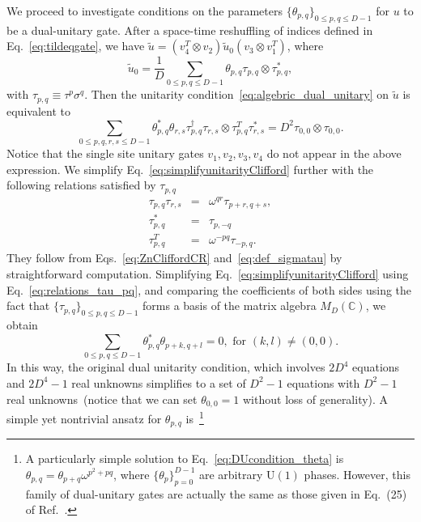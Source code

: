\documentclass[aps,prx,twocolumn,notitlepage,nofootinbib,nobalancelastpage]{revtex4-2}
\theoremstyle{break}
\newcommand{\1}{\mathbbm{1}}
\theoremstyle{plain}
\theoremstyle{plain}
\theoremstyle{plain}
\begin{document}
We proceed to investigate conditions on the parameters $\{\theta_{p,q}\}_{0\leq p,q\leq D-1}$ for $u$ to be a dual-unitary gate. After a space-time reshuffling of indices defined in Eq.~\eqref{eq:tildeqgate}, we have $\tilde{u}= (v_4^T\otimes v_2)\tilde{u}_0(v_3\otimes v_1^T)$, where
\begin{equation}
    \tilde{u}_0=\frac{1}{D}\sum_{0\leq p,q\leq D-1} \theta_{p,q}\tau_{p,q}\otimes\tau^*_{p,q},
\end{equation}
with $\tau_{p,q}\equiv\tau^p\sigma^q$. Then the unitarity condition~\eqref{eq:algebric_dual_unitary} on $\tilde{u}$ is equivalent to 
\begin{equation}\label{eq:simplifyunitarityClifford}
    \sum_{0\leq p,q,r,s\leq D-1} \theta^*_{p,q}\theta_{r,s}\tau^\dagger_{p,q}\tau_{r,s}\otimes\tau^T_{p,q}\tau^*_{r,s}=D^2 \tau_{0,0}\otimes\tau_{0,0}.
\end{equation}
Notice that the single site unitary gates $v_{1},v_{2},v_{3},v_{4}$ do not appear in the above expression. We simplify Eq.~\eqref{eq:simplifyunitarityClifford} further with the following relations satisfied by $\tau_{p,q}$
\begin{eqnarray}\label{eq:relations_tau_pq}
    \tau_{p,q}\tau_{r,s}&=&\omega^{qr}\tau_{p+r,q+s},\nonumber\\
    \tau^*_{p,q}&=&\tau_{p,-q}\nonumber\\
    \tau^T_{p,q}&=&\omega^{-pq}\tau_{-p,q}.
\end{eqnarray}
They follow from Eqs.~\eqref{eq:ZnCliffordCR} and~\eqref{eq:def_sigmatau} by straightforward computation. Simplifying Eq.~\eqref{eq:simplifyunitarityClifford} using Eq.~\eqref{eq:relations_tau_pq}, and comparing the coefficients of both sides using the fact that $\{\tau_{p,q}\}_{0\leq p,q\leq D-1}$ forms a basis of the matrix algebra $M_D(\mathbb{C})$, we obtain 
\begin{equation}\label{eq:DUcondition_theta}
    \sum_{0\leq p,q\leq D-1} \theta_{p,q}^* \theta_{p+k,q+l} =0,\text{ for }(k,l)\neq (0,0).
\end{equation}
In this way, the original dual unitarity condition, which involves $2D^4$ equations and $2D^4-1$ real unknowns simplifies to a set of $D^2-1$ equations with $D^2-1$ real unknowns~(notice that we can set $\theta_{0,0}=1$ without loss of generality).  A simple yet nontrivial ansatz for $\theta_{p,q}$ is~\footnote{A particularly simple solution to Eq.~\eqref{eq:DUcondition_theta} is
$\theta_{p,q}=\theta_{p+q}\omega^{p^2+pq}$,
where $\{\theta_{p}\}_{p=0}^{D-1}$ are arbitrary U$(1)$ phases. However, this family of dual-unitary gates are actually the same as those given in Eq.~(25) of Ref.~\cite{marton2022construction}.}
\end{document}
